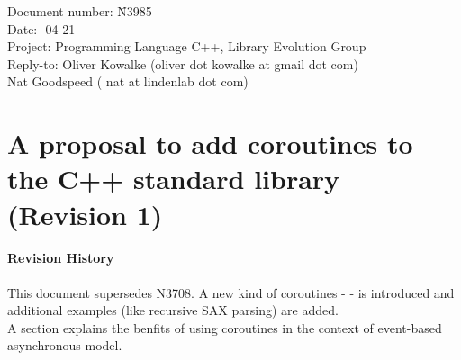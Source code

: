 \documentclass[a4paper,10pt,DIV15]{scrartcl}
\begin{document}
\small
\begin{tabbing}
    Document number: \= N3985\\
    Date:            -04-21 \\
    Project:         \> Programming Language C++, Library Evolution Group\\
    Reply-to:        \> Oliver Kowalke (oliver dot kowalke at gmail dot com)\\
                     \> Nat Goodspeed ( nat at lindenlab dot com)\\
\end{tabbing}

\section*{A proposal to add coroutines to the C++ standard library (Revision 1)}


\tableofcontents


\paragraph*{Revision History}
This document supersedes N3708. A new kind of coroutines - \scoro - is introduced
and additional examples (like recursive SAX parsing) are added.\\
A section explains the benfits of using coroutines in the context of event-based
asynchronous model.













\end{document}
